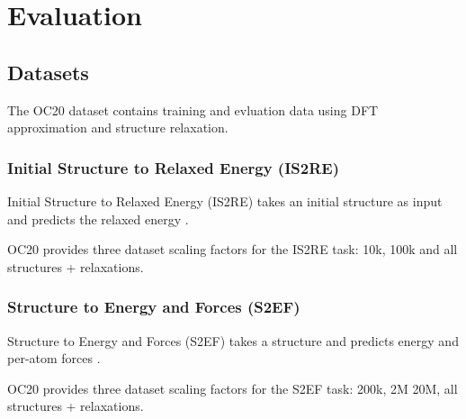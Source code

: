 \section{Evaluation}
\label{section:evaluation}

\subsection{Datasets}

The OC20 dataset contains training and evluation data using DFT approximation and 
structure relaxation. 

\subsubsection{Initial Structure to Relaxed Energy (IS2RE)}

Initial Structure to Relaxed Energy (IS2RE) takes an initial structure as input and 
predicts the relaxed energy \cite*{Chanussot_2021, https://doi.org/10.48550/arxiv.2206.08917}.

OC20 provides three dataset scaling factors for the IS2RE task: 10k, 100k and 
all structures + relaxations.

\subsubsection{Structure to Energy and Forces (S2EF)}

Structure to Energy and Forces (S2EF) takes a structure and predicts energy and 
per-atom forces \cite*{Chanussot_2021, https://doi.org/10.48550/arxiv.2206.08917}. 

OC20 provides three dataset scaling factors for the S2EF task: 200k, 2M 20M,  
all structures + relaxations.